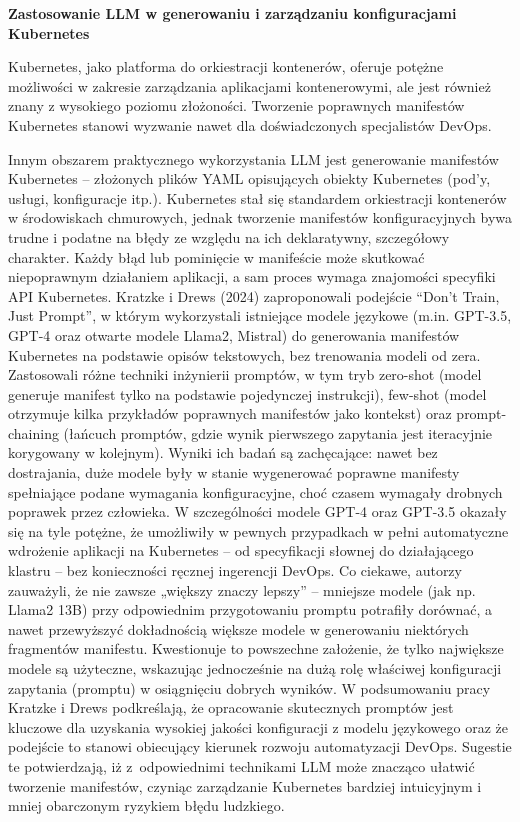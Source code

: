 %

\textbf{Zastosowanie LLM w generowaniu i zarządzaniu konfiguracjami Kubernetes}

Kubernetes, jako platforma do orkiestracji kontenerów, oferuje potężne możliwości w zakresie zarządzania aplikacjami kontenerowymi, ale jest również znany z wysokiego poziomu złożoności. Tworzenie poprawnych manifestów Kubernetes stanowi wyzwanie nawet dla doświadczonych specjalistów DevOps.

Innym obszarem praktycznego wykorzystania LLM jest generowanie manifestów Kubernetes – złożonych plików YAML opisujących obiekty Kubernetes (pod’y, usługi, konfiguracje itp.). Kubernetes stał się standardem orkiestracji kontenerów w środowiskach chmurowych, jednak tworzenie manifestów konfiguracyjnych bywa trudne i podatne na błędy ze względu na ich deklaratywny, szczegółowy charakter. Każdy błąd lub pominięcie w manifeście może skutkować niepoprawnym działaniem aplikacji, a sam proces wymaga znajomości specyfiki API Kubernetes. Kratzke i Drews (2024) zaproponowali podejście “Don’t Train, Just Prompt”, w którym wykorzystali istniejące modele językowe (m.in. GPT-3.5, GPT-4 oraz otwarte modele Llama2, Mistral) do generowania manifestów Kubernetes na podstawie opisów tekstowych, bez trenowania modeli od zera. Zastosowali różne techniki inżynierii promptów, w tym tryb zero-shot (model generuje manifest tylko na podstawie pojedynczej instrukcji), few-shot (model otrzymuje kilka przykładów poprawnych manifestów jako kontekst) oraz prompt-chaining (łańcuch promptów, gdzie wynik pierwszego zapytania jest iteracyjnie korygowany w kolejnym). Wyniki ich badań są zachęcające: nawet bez dostrajania, duże modele były w stanie wygenerować poprawne manifesty spełniające podane wymagania konfiguracyjne, choć czasem wymagały drobnych poprawek przez człowieka. W szczególności modele GPT-4 oraz GPT-3.5 okazały się na tyle potężne, że umożliwiły w pewnych przypadkach w pełni automatyczne wdrożenie aplikacji na Kubernetes – od specyfikacji słownej do działającego klastru – bez konieczności ręcznej ingerencji DevOps. Co ciekawe, autorzy zauważyli, że nie zawsze „większy znaczy lepszy” – mniejsze modele (jak np. Llama2 13B) przy odpowiednim przygotowaniu promptu potrafiły dorównać, a nawet przewyższyć dokładnością większe modele w generowaniu niektórych fragmentów manifestu. Kwestionuje to powszechne założenie, że tylko największe modele są użyteczne, wskazując jednocześnie na dużą rolę właściwej konfiguracji zapytania (promptu) w osiągnięciu dobrych wyników. W podsumowaniu pracy Kratzke i Drews podkreślają, że opracowanie skutecznych promptów jest kluczowe dla uzyskania wysokiej jakości konfiguracji z modelu językowego oraz że podejście to stanowi obiecujący kierunek rozwoju automatyzacji DevOps. Sugestie te potwierdzają, iż z odpowiednimi technikami LLM może znacząco ułatwić tworzenie manifestów, czyniąc zarządzanie Kubernetes bardziej intuicyjnym i mniej obarczonym ryzykiem błędu ludzkiego.

